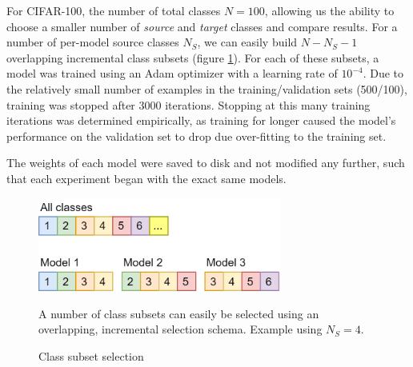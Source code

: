 \documentclass{report}
\begin{document}
	For CIFAR-100, the number of total classes $N=100$, allowing us the ability to choose a smaller number of \emph{source} and \emph{target} classes and compare results. For a number of per-model source classes $N_S$, we can easily build $N-N_S-1$ overlapping incremental class subsets (figure \ref{fig:subsets:1}).
	For each of these subsets, a model was trained using an Adam optimizer with a learning rate of $10^{-4}$. Due to the relatively small number of examples in the training/validation sets (500/100), training was stopped after 3000 iterations. Stopping at this many training iterations was determined empirically, as training for longer caused the model's performance on the validation set to drop due over-fitting to the training set. \par
	The weights of each model were saved to disk and not modified any further, such that each experiment began with the exact same models. \par
	\begin{figure}[h]
		\centering
		\includegraphics[width=8cm]{modelsubsets}
		\caption{Class subset selection}
		A number of class subsets can easily be selected using an overlapping, incremental selection schema. Example using $N_S = 4$.
		\label{fig:subsets:1}
	\end{figure}
\end{document}
